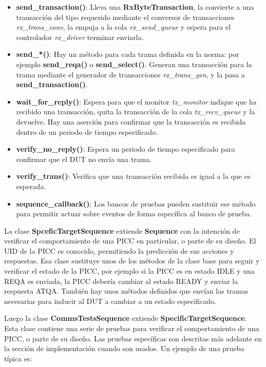 \documentclass[a4paper, twoside, 11pt]{report}
\begin{document}
\begin{itemize}
  \item \textbf{send\_transaction()}: Lleva una \textbf{RxByteTransaction}, la convierte a una transacción del tipo requerido mediante el conversor de transacciones \textit{rx\_trans\_conv}, la empuja a la cola \textit{rx\_send\_queue} y espera para el controlador \textit{rx\_driver} terminar enviarla.
  \item \textbf{send\_*()}: Hay un método para cada trama definida en la norma: por ejemplo \textbf{send\_reqa()} o \textbf{send\_select()}. Generan una transacción para la trama mediante el generador de transacciones \textit{rx\_trans\_gen}, y la pasa a \textbf{send\_transaction()}.
  \item \textbf{wait\_for\_reply()}: Espera para que el monitor \textit{tx\_monitor} indique que ha recibido una transacción, quita la transacción de la cola \textit{tx\_recv\_queue} y la devuelve. Hay una aserción para confirmar que la transacción es recibida dentro de un periodo de tiempo especificado.
  \item \textbf{verify\_no\_reply()}: Espera un periodo de tiempo especificado para confirmar que el DUT no envía una trama.
  \item \textbf{verify\_trans()}: Verifica que una transacción recibida es igual a la que es esperada.
  \item \textbf{sequence\_callback()}: Los bancos de pruebas pueden sustituir ese método para permitir actuar sobre eventos de forma específica al banco de prueba.
\end{itemize}
La clase \textbf{SpceficTargetSequence} extiende \textbf{Sequence} con la intención de verificar el comportamiento de una PICC en particular, o parte de su diseño. El UID de la PICC es conocido, permitiendo la predicción de sus acciones y respuestas. Esa clase sustituye unos de los métodos de la clase base para seguir y verificar el estado de la PICC, por ejemplo si la PICC es en estado IDLE y una REQA es enviada, la PICC debería cambiar al estado READY y enviar la respuesta ATQA. También hay unos métodos definidos que envían las tramas necesarias para inducir al DUT a cambiar a un estado especificado.

Luego la clase \textbf{CommsTestsSequence} extiende \textbf{SpecificTargetSequence}. Esta clase contiene una serie de pruebas para verificar el comportamiento de una PICC, o parte de su diseño. Las pruebas específicas son descritas más adelante en la sección de implementación cuando son usados. Un ejemplo de una prueba típica es:
\end{document}
